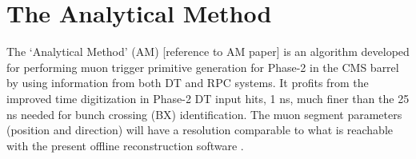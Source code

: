 \documentclass[../main.tex]{subfiles}
\begin{document}
\chapter{The Analytical Method}

The `Analytical Method' (AM) [reference to AM paper] is an algorithm developed for performing muon trigger primitive generation for Phase-2 in the CMS barrel by using information from both DT and RPC systems. It profits from the improved time digitization in Phase-2 DT input hits, 1 ns, much finer than the 25 ns needed for bunch crossing (BX) identification. The muon segment parameters (position and direction) will have a resolution comparable to what is reachable with the present offline reconstruction software \cite{dts:performance_offline}.



\end{document}

